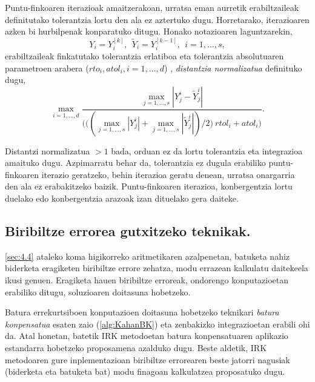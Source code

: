 Puntu-finkoaren iterazioak amaitzerakoan, urratsa eman aurretik erabiltzaileak definitutako tolerantzia lortu den ala ez aztertuko dugu. Horretarako, iterazioaren azken bi hurbilpenak konparatuko ditugu. Honako notazioaren laguntzarekin,
\begin{equation*}
Y_i=Y_i^{[k]}, \ \ \tilde{Y}_i=Y_i^{[k-1]}, \ \ i=1,\dots,s,
\end{equation*}  
erabiltzaileak finkatutako tolerantzia erlatiboa eta tolerantzia absolutuaren parametroen arabera ($rto_i,atol_i, i=1,\dots,d$) , \emph{distantzia normalizatua} definituko dugu,
\begin{equation*}
\max_{i=1,\dots,d} \frac{\max_{j=1,\dots,s} |Y_j^i-\tilde{Y}_j^i|}
                        {\bigg(\big((\max_{j=1,\dots,s} |Y_j^i|+\max_{j=1,\dots,s} |\tilde{Y}_j^i|)/2 \big) \ rtol_i+ atol_i \bigg)}.
\end{equation*}

Distantzi normalizatua $>1$ bada, orduan ez da lortu tolerantzia eta integrazioa amaituko dugu.
Azpimarratu behar da, tolerantzia ez dugula erabiliko puntu-finkoaren iterazio geratzeko, behin iterazioa geratu denean, urratsa onargarria den ala ez erabakitzeko baizik. Puntu-finkoaren iterazioa, konbergentzia lortu duelako edo konbergentzia arazoak izan dituelako gera daiteke. 

\subsection{Biribiltze errorea gutxitzeko teknikak.}

\ref{sec:4.4} ataleko koma higikorreko aritmetikaren azalpenetan, batuketa nahiz biderketa eragiketen biribiltze errore zehatza, modu errazean kalkulatu daitekeela ikusi genuen. Eragiketa hauen biribiltze erroreak, ondorengo konputazioetan erabiliko ditugu, soluzioaren doitasuna hobetzeko.

Batura errekurtsiboen konputazioen doitasuna hobetzeko teknikari \emph{batura konpensatua} esaten zaio (\ref{alg:KahanBK}) eta zenbakizko integrazioetan erabili ohi da. Atal honetan, batetik IRK metodoetan batura konpensatuaren aplikazio estandarra hobetzeko proposamena azalduko dugu. Beste aldetik, IRK metodoaren gure  inplementazioan biribiltze errorearen beste jatorri nagusiak (biderketa eta batuketa bat) modu finagoan kalkulatzea proposatuko dugu.    


